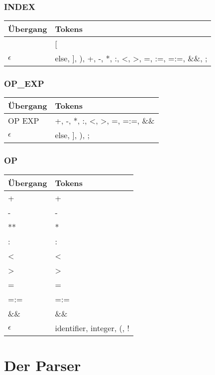 \documentclass[
a4paper,   %
11pt,      %
oneside,   %
onecolumn, %
final      %
]{article}
\begin{document}
\subsubsection{INDEX}
\begin{tabular}{| l | l |}
	\hline
		\"Ubergang & Tokens \\
		\hline
		[EXP] & [ \\
		$\epsilon$ & else, ], ), +, -, *, :, <, >, =, :=, =:=, \&\&, ; \\
	\hline
\end{tabular}
\newline

\subsubsection{OP\_EXP}
\begin{tabular}{| l | l |}
	\hline
		\"Ubergang & Tokens \\
		\hline
		OP EXP & +, -, *, :, <, >, =, =:=, \&\& \\
		$\epsilon$ & else, ], ), ; \\
	\hline
\end{tabular}
\newline

\subsubsection{OP}
\begin{tabular}{| l | l |}
	\hline
		\"Ubergang & Tokens \\
		\hline
		+ & + \\
		- & - \\
		** & * \\
		: & : \\
		< & < \\
		> & > \\
		= & = \\
		=:= & =:= \\
		\&\& & \&\& \\
		$\epsilon$ & identifier, integer, (, ! \\
	\hline
\end{tabular}
\newline

\section{Der Parser} \label{sec:parser}
\end{document}
